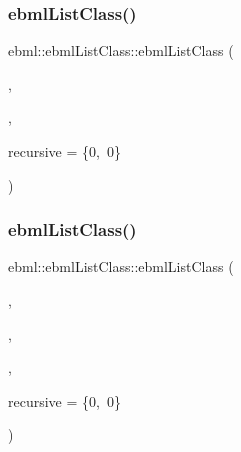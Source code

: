 \mbox{\label{classebml_1_1ebmlListClass_ae4f1d932d3b0ba6db79b7fd43f4b9035}} 
\subsubsection{\texorpdfstring{ebml\+List\+Class()}{ebmlListClass()}\hspace{0.1cm}{\footnotesize\ttfamily [4/6]}}
{\footnotesize\ttfamily ebml\+::ebml\+List\+Class\+::ebml\+List\+Class (\begin{DoxyParamCaption}\item[{\mbox{\hyperlink{namespaceebml_a86c5f604ddf12a74aa9812e997a58691}{ebml\+I\+D\+\_\+t}}}]{,  }\item[{const std\+::wstring \&}]{,  }\item[{const \mbox{\hyperlink{structebml_1_1occurSpec__t}{occur\+Spec\+\_\+t}} \&}]{recursive = {\ttfamily \{0,~0\}} }\end{DoxyParamCaption})}

\mbox{\label{classebml_1_1ebmlListClass_a25897c22d3fdc3bf7c4f5751cabf57b6}} 
\subsubsection{\texorpdfstring{ebml\+List\+Class()}{ebmlListClass()}\hspace{0.1cm}{\footnotesize\ttfamily [5/6]}}
{\footnotesize\ttfamily ebml\+::ebml\+List\+Class\+::ebml\+List\+Class (\begin{DoxyParamCaption}\item[{\mbox{\hyperlink{namespaceebml_a86c5f604ddf12a74aa9812e997a58691}{ebml\+I\+D\+\_\+t}}}]{,  }\item[{const std\+::wstring \&}]{,  }\item[{const \mbox{\hyperlink{namespaceebml_abf07998998c284c9be3f76b5d9e192e1}{child\+Class\+Spec\+Arg\+\_\+l}} \&}]{,  }\item[{const \mbox{\hyperlink{structebml_1_1occurSpec__t}{occur\+Spec\+\_\+t}} \&}]{recursive = {\ttfamily \{0,~0\}} }\end{DoxyParamCaption})}

